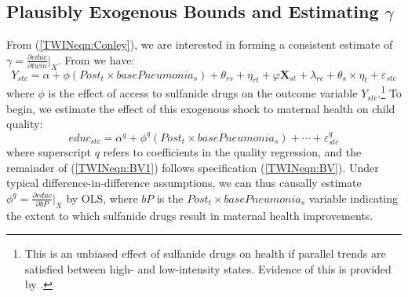 \documentclass[subeqn]{article}
\begin{document}
\begin{spacing}{1.4}
\section{Plausibly Exogenous Bounds and Estimating $\gamma$}
\label{TWINscn:gamma}
From (\ref{TWINeqn:Conley}), we are interested in forming a consistent estimate
of $\gamma=\frac{\partial educ}{\partial twin}\big|_{X}$. From 
\citet{BhalotraVenkataramani2014} we have:
\begin{equation}
\label{TWINeqn:BV}
Y_{stc} = \alpha + \phi (Post_t\times basePneumonia_s) +\theta_{rs} +\eta_{rt}
+\varphi\mathbf{X}_{st}+\lambda_{rc}+\theta_s\times\eta_t+\varepsilon_{stc}
\end{equation}
where $\phi$ is the effect of access to sulfanide drugs on the outcome variable 
$Y_{stc}$.\footnote{This is an unbiased effect of sulfanide drugs on health if
parallel trends are satisfied between high- and low-intensity states. Evidence of
this is provided by \citet{BhalotraVenkataramani2014}.}  To begin, we estimate 
the effect of this exogenous shock to maternal health on child quality:
\begin{equation}
\label{TWINeqn:BV1}
educ_{stc} = \alpha^q + \phi^q (Post_t\times basePneumonia_s) +\cdots+\varepsilon^q_{stc} 
\end{equation}
where superscript $q$ refers to coefficients in the quality regression, and the 
remainder of (\ref{TWINeqn:BV1}) follows specification (\ref{TWINeqn:BV}).  
Under typical difference-in-difference assumptions, we can thus causally 
estimate $\phi^q=\frac{\partial educ}{\partial bP}\big|_{X}$ by OLS, where $bP$ 
is the $Post_t\times basePneumonia_s$ variable indicating the extent to which
sulfanide drugs result in maternal health improvements.


\end{spacing}
\end{document}
